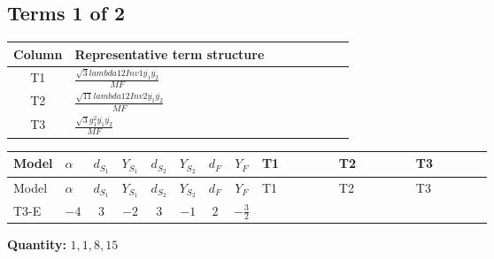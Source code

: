 \documentclass[8pt]{article}
\begin{document}
\begin{landscape}
\subsection*{Terms 1 of 2}
\begin{center}
\begin{tabular}{@{}c >{\raggedright\arraybackslash}p{0.82\linewidth}@{}}
\toprule
Column & Representative term structure \\
\midrule
T1 & \(\displaystyle \frac{\sqrt{3} lambda12Inv1 \overline{y_{1}} \overline{y_{2}}}{MF}\) \\
\midrule
T2 & \(\displaystyle \frac{\sqrt{11} lambda12Inv2 \overline{y_{1}} \overline{y_{2}}}{MF}\) \\
\midrule
T3 & \(\displaystyle \frac{\sqrt{3} g_{1}^{2} \overline{y_{1}} \overline{y_{2}}}{MF}\) \\
\midrule
\bottomrule
\end{tabular}
\end{center}
\smallskip
\tiny
\begin{longtable}{@{}llcccccc >{\raggedright\arraybackslash}p{0.21\linewidth} >{\raggedright\arraybackslash}p{0.21\linewidth} >{\raggedright\arraybackslash}p{0.21\linewidth}@{}}
\toprule
Model & $\alpha$ & $d_{S_1}$ & $Y_{S_1}$ & $d_{S_2}$ & $Y_{S_2}$ & $d_F$ & $Y_F$ & T1 & T2 & T3 \\
\midrule
\endfirsthead
\toprule
Model & $\alpha$ & $d_{S_1}$ & $Y_{S_1}$ & $d_{S_2}$ & $Y_{S_2}$ & $d_F$ & $Y_F$ & T1 & T2 & T3 \\
\midrule
\endhead
T3-E & $-4$ & $3$ & $-2$ & $3$ & $-1$ & $2$ & $-\frac{3}{2}$ & \scriptsize\adjustbox{max width=\linewidth}{$\begin{gathered} - \frac{\sqrt{3} lambda12Inv1 \overline{y_{1}} \overline{y_{2}}}{6 MF}\end{gathered}$} & \scriptsize\adjustbox{max width=\linewidth}{$\begin{gathered} \frac{3 \sqrt{11} lambda12Inv2 \overline{y_{1}} \overline{y_{2}}}{22 MF}\end{gathered}$} & \scriptsize\adjustbox{max width=\linewidth}{$\begin{gathered} \frac{9 \sqrt{3} g_{1}^{2} \overline{y_{1}} \overline{y_{2}}}{8 MF}\end{gathered}$} \\
\midrule
\bottomrule
\end{longtable}
\clearpage
\noindent\textbf{Quantity: }$\mathrm{1,1,8,15}$\par\smallskip

\end{landscape}
\end{document}
